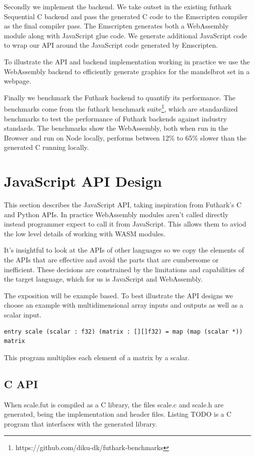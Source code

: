 \documentclass[11pt]{book}
\begin{document}
Secondly we implement the backend. We take outset in the existing futhark Sequential C backend and pass the generated C code to the Emscripten compiler as the final compiler pass. The Emscripten generates both a WebAssembly module along with JavaScript glue code. We generate additional JavaScript code to wrap our API around the JavaScript code generated by Emscripten.

To illustrate the API and backend implementation working in practice we use the WebAssembly backend to efficiently generate graphics for the mandelbrot set in a webpage.

Finally we benchmark the Futhark backend to quantify its performance. The benchmarks come from the futhark benchmark suite\footnote{https://github.com/diku-dk/futhark-benchmarks}, which are standardized benchmarks to test the performance of Futhark backends against industry standards. The benchmarks show the WebAssembly, both when run in the Browser and run on Node locally, performs between 12\% to 65\% slower than the generated C running locally. 

\section{JavaScript API Design}

This section describes the JavaScript API, taking inspiration from Futhark's C and Python APIs. In practice WebAssembly modules aren't called directly instead programmer expect to call it from JavaScript. This allows them to aviod the low level details of working with WASM modules. 


It's insightful to look at the APIs of other languages so we copy the elements of the APIs that are effective and avoid the parts that are cumbersome or inefficient. These decisions are constrained by the limitations and capabilities of the target language, which for us is JavaScript and WebAssembly.

The exposition will be example based. To best illustrate the API designs we choose an example with multidimensional array inputs and outputs as well as a scalar input. 
\begin{verbatim}
entry scale (scalar : f32) (matrix : [][]f32) = map (map (scalar *)) matrix
\end{verbatim}
This program multiplies each element of a matrix by a scalar.

\subsection{C API}
When scale.fut is compiled as a C library, the files scale.c and scale.h are generated, being the implementation and header files. Listing TODO is a C program that interfaces with the generated library. 
\end{document}
